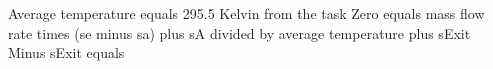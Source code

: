 Average temperature equals 295.5 Kelvin from the task
Zero equals mass flow rate times (se minus sa) plus sA divided by average temperature plus sExit
Minus sExit equals